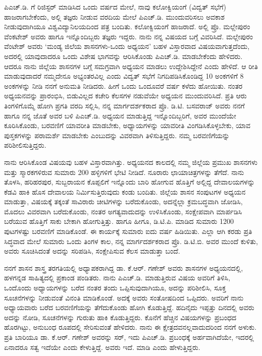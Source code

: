 ಪಿಎಚ್​.ಡಿ. ಗೆ ರಿಜಿಸ್ಟರ್​ ಮಾಡಿಸಿದ ಒಂದು ವರ್ಷದ ಮೇಲೆ, ನಾವು ಕಲೋಕ್ವಿಯಂಗೆ (ವಿದ್ವತ್​ ಸಭೆಗೆ) ಹಾಜರಾಗಬೇಕೆಂದು, ಅಲ್ಲಿ ತಜ್ಞರು ನೀಡುವ ವರದಿಯ ಮೇಲೆ ಪಿಎಚ್​.ಡಿ. ಮುಂದುವರಿಸಲು ಅವಕಾಶ ನೀಡುವುದಾಗಿಯೂ ವಿಶ್ವವಿದ್ಯಾನಿಲಯದಿಂದ ಪತ್ರ ಬಂದಿತು. ಕಲೋಕ್ವಿಯಂಗೆ ಹಾಜರಾದೆ. ಅಲ್ಲಿ ಪ್ರೊ. ಮಲ್ಲೇಪುರಂ ವೆಂಕಟೇಶ್​ ಅವರು ಹಾಗೂ ಇನ್ನೊಂದಿಬ್ಬರು ತಜ್ಞರು ಇದ್ದರು. ನಾನು ನನ್ನ ವಿಷಯದ ಬಗ್ಗೆ ವಿವರಿಸಿದೆ. ಮಲ್ಲೇಪುರಂ ವೆಂಟೇಶ್​ ಅವರು ‘ಮಂಡ್ಯ ಜಿಲೆಯ ಶಾಸನಗಳು-ಒಂದು ಅಧ್ಯಯನ’ ಬಹಳ ವಿಸ್ತಾರವಾದ ವಿಷಯವಾಗುತ್ತದೆಂದು, ಅದರಲ್ಲಿ ಯಾವುದಾದರೂ ಒಂದು ವಿಶೇಷ ಭಾಗವನ್ನು ಆರಿಸಿಕೊಂಡು ಪಿಎಚ್​.ಡಿ. ಮಾಡಬೇಕೆಂದು ಹೇಳಿದರು. ಆದರೂ ನಾನು ಜಿಲ್ಲೆಯ ಶಾಸನಗಳ ಬಗ್ಗೆ ಸಮಗ್ರವಾಗಿ ಅಧ್ಯಯನ ಮಾಡಲು ಉದ್ದೇಶಿಸಿದ್ದೇನೆ ಎಂದು ಹೇಳಿದೆ. ಆ ರೀತಿ ಮಾಡುವುದಾದರೆ ನಮ್ಮದೇನೂ ಅಭ್ಯಂತರವಿಲ್ಲ ಎಂದು ವಿದ್ವತ್​ ಸಭೆಗೆ ನಿಗದಿಪಡಿಸಿಕೊಂಡಿದ್ದ 10 ಅಂಕಗಳಿಗೆ 8 ಅಂಕಗಳನ್ನು ನೀಡಿ ನನಗೆ ಅನುಮತಿ ನೀಡಿದರು. ಹೀಗೆ ಒಂದು ಒಂದೂವರೆ ವರ್ಷ ಕಳೆದು ಹೋಯಿತು. ನಂತರ ಅಧ್ಯಯನವನ್ನು ಪ್ರಾರಂಭಿಸಿ, ಬಿಡುವಿಲ್ಲದ ಕಚೇರಿ ಕೆಲಸಗಳ ನಡುವೆಯೇ ಅಧ್ಯಯನ ಮುಂದುವರಿಸಿದೆ. ಪ್ರತಿ ಆರು ತಿಂಗಳಿಗೊಮ್ಮೆ ಹೋಗಿ ಪ್ರಗತಿ ವರದಿ ಸಲ್ಲಿಸಿ, ನನ್ನ ಮಾರ್ಗದರ್ಶಕರಾದ ಪ್ರೊ. ಡಿ.ಟಿ. ಬಸವರಾಜ್​ ಅವರು ನನಗೆ ಹಾಗೂ ನನ್ನ ಜೊತೆ ಅವರ ಬಳಿ ಪಿಎಚ್​.ಡಿ. ಅಧ್ಯಯನ ಮಾಡುತ್ತಿದ್ದ ಇನ್ನೊಂದಿಬ್ಬರಿಗೆ, ಅವರ ಮುಂದೆಯೇ ಕೂರಿಸಿಕೊಂಡು, ಬರವಣಿಗೆ ಯಾವರೀತಿ ಮಾಡಬೇಕು, ಅಧ್ಯಾಯಗಳನ್ನು ಯಾವರೀತಿ ವಿಂಗಡಿಸಿಕೊಳ್ಳಬೇಕು, ಯಾವ ಪುಸ್ತಕಗಳನ್ನು ಪರಾಮರ್ಶೆ ಮಾಡಬೇಕು ಎಂಬುದನ್ನು ವಿವರವಾಗಿ ತಿಳಿಸುತ್ತಿದ್ದರು. ನಮ್ಮ ಬರವಣಿಗೆಯನ್ನು ಪರಿಶೀಲಿಸುತ್ತಿದ್ದರು. 

\newpage

ನಾನು ಆರಿಸಿಕೊಂಡ ವಿಷಯವು ಬಹಳ ವಿಸ್ತಾರವಾಗಿತ್ತು. ಅಧ್ಯಯನದ ಕಾಲದಲ್ಲಿ ನಮ್ಮ ಜಿಲ್ಲೆಯ ಪ್ರಮುಖ ಶಾಸನಗಳು ಮತ್ತು ಸ್ಮಾರಕಗಳಿರುವ ಸುಮಾರು 200 ಹಳ್ಳಿಗಳಿಗೆ ಭೇಟಿ ನೀಡಿದೆ. ನೂರಾರು ಛಾಯಾಚಿತ್ರಗಳನ್ನು ತೆಗೆದೆ. ನಾನು ತೊಳಸಿ, ಹರಿಹರಪುರ, ಸುಬ್ಬರಾಯನ ಕೊಪ್ಪಲಿಗೆ ಇನ್ನೊಂದು ಬಾರಿ ಹೋಗುವ ಹೊತ್ತಿಗೆ ಅಲ್ಲಿದ್ದ ದೇವಾಲಯಗಳನ್ನು ಕೆಡವಿ ಹಾಕಿ ಹೊಸ ದೇವಾಲಯ ನಿರ್ಮಿಸುತ್ತಿರುವುದು ಕಂಡು ಬಂದಿತು. ಜಿಲ್ಲೆಯ ಶಾಸನ ಸಂಪುಟಗಳ ಅಧ್ಯಯನ ಮಾಡುತ್ತಾ, ವಿಷಯಕ್ಕೆ ತಕ್ಕಂತೆ ಸಾವಿರಾರು ಚೀಟಿಗಳನ್ನು ಬರೆದುಕೊಂಡು, ಅದನ್ನೆಲ್ಲಾ ಕ್ರಮಬದ್ಧವಾಗಿ ಜೋಡಿಸಿ, ಮೊದಲು ವಿವರವಾಗಿ ಬರೆದುಕೊಂಡು, ನಂತರ ಅಗತ್ಯವಾದುದನ್ನು ಉಳಿಸಿಕೊಂಡು, ಸಂಕ್ಷೇಪವಾಗಿ ಮಾರ್ಪಡಿಸಿ ಬರೆಯುವ ಹೊತ್ತಿಗೆ ಸಾಕು ಬೇಕಾಗಿ ಹೋಗುತ್ತಿತ್ತು. ಹಾಗೂ ಹೀಗೂ, ಡಿ.ಟಿ.ಪಿ. ಮಾಡಿದ ಸುಮಾರು 1200 ಪುಟಗಳಷ್ಟು ಬರವಣಿಗೆ ಮಾಡಿಕೊಂಡೆ. ಈ ಕಾರ್ಯಕ್ಕೆ ಸುಮಾರು ಐದು ವರ್ಷ ಹಿಡಿಯಿತು. ಎಲ್ಲಾ ಆಗಿ ಕರಡು ಪ್ರತಿ ಸಿದ್ಧವಾದ ಮೇಲೆ ಸುಮಾರು ಒಂದು ತಿಂಗಳ ಕಾಲ, ನನ್ನ ಮಾರ್ಗದರ್ಶಕರಾದ ಪ್ರೊ. ಡಿ.ಟಿ.ಬಿ. ಅವರ ಮುಂದೆ ಕುಳಿತು, ಅವರು ಸೂಚಿಸಿದಂತೆ ಅದನ್ನು ಸರಿಪಡಿಸಿ, ಸಂಕ್ಷೇಪಿಸುವ ಕೆಲಸ ಮಾಡುತ್ತಾ ಬಂದೆ. 

ನನಗೆ ಶಾಸನ ಶಾಸ್ತ್ರ ತರಗತಿಯಲ್ಲಿ ಅಧ್ಯಾಪಕರಾಗಿದ್ದ ಡಾ. ಕೆ.ಆರ್​. ಗಣೇಶ್​ ಅವರು ಶಾಸನಗಳ ಅಧ್ಯಯನದಲ್ಲಿ, ಹಳಗನ್ನಡ ಸಾಹಿತ್ಯದಲ್ಲಿ ಪ್ರಕಾಂಡ ಪಂಡಿತರು. ನಾನು ಪಿಎಚ್​.ಡಿ. ಮಾಡುತ್ತಿರುವ ವಿಷಯ ಅವರಿಗೆ ತಿಳಿಸಿ, ಒಂದೊಂದು ಅಧ್ಯಾಯಗಳನ್ನು ಬರೆದ ನಂತರ ತಂದು ಒಪ್ಪಿಸುವುದಾಗಿಯೂ, ಅದನ್ನು ಪರಿಶೀಲಿಸಿ, ಸೂಕ್ತ ಸೂಚನೆಗಳನ್ನು ನೀಡುವಂತೆ ವಿನಂತಿ ಮಾಡಿಕೊಂಡೆ. ಅದಕ್ಕೆ ಅವರು ಸಂತೋಷದಿಂದ ಒಪ್ಪಿದರು. ಅವರಿಗೆ ನಾನು ಅಧ್ಯಾಯವಾರು ಬರೆದ ಬರವಣಿಗೆಯನ್ನು ತೆಗೆದುಕೊಂಡು ಹೋಗಿ ಕೊಡುತ್ತಿದ್ದೆ. ಹದಿನೈದು ಇಪ್ಪತ್ತು ದಿನದಲ್ಲಿ ಅವರು ಅದನ್ನು ನೋಡಿ, ಸೂಚನೆಗಳನ್ನು ಗುರುತು ಹಾಕಿ ಕೊಡುತ್ತಿದ್ದರು. ಕೊನೆಗೆ ಹೆಚ್ಚಿನ ವಿಷಯಗಳನ್ನು ಪ್ರಬಂಧದ ಹೊರಗಿಟ್ಟು, ಅನುಬಂಧ ರೂಪದಲ್ಲಿ ಸೇರಿಸುವಂತೆ ಹೇಳಿದರು. ನಾನು ಈ ಕ್ಷೇತ್ರದವನಲ್ಲವಾದುದರಿಂದ ನನಗೆ ಅಳುಕು. ಪ್ರತಿ ಬಾರಿಯೂ ಡಾ. ಕೆ.ಆರ್​. ಗಣೇಶ್​ ಅವರನ್ನು ಸರ್​, ಇದು ಪಿಎಚ್​.ಡಿ. ಪ್ರಬಂಧಕ್ಕೆ ಅರ್ಹವಾಗಿದೆಯೇ, ಇದರಲ್ಲಿ ಏನಾದರೂ ಸತ್ವ ಇದೆಯೇ ಎಂದು ಕೇಳುತ್ತಿದ್ದೆ. ಅವರು ಇದೆ. ಮಾಡಿ ಎಂದು ಹೇಳುತ್ತಿದ್ದರು.

